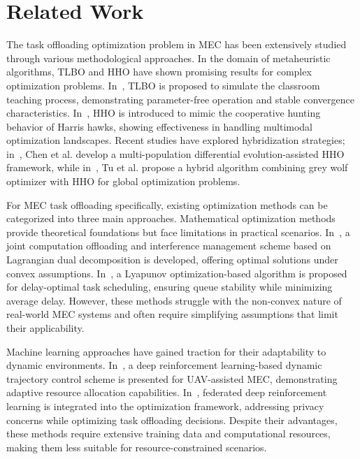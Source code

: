 \documentclass[conference]{IEEEtran}
\begin{document}
\section{Related Work}

The task offloading optimization problem in MEC has been extensively studied through various methodological approaches. In the domain of metaheuristic algorithms, TLBO and HHO have shown promising results for complex optimization problems. In~\cite{rao2011teaching}, TLBO is proposed to simulate the classroom teaching process, demonstrating parameter-free operation and stable convergence characteristics. In~\cite{heidari2019harris}, HHO is introduced to mimic the cooperative hunting behavior of Harris hawks, showing effectiveness in handling multimodal optimization landscapes. Recent studies have explored hybridization strategies; in~\cite{chen2020multi}, Chen et al. develop a multi-population differential evolution-assisted HHO framework, while in~\cite{tu2023hybrid}, Tu et al. propose a hybrid algorithm combining grey wolf optimizer with HHO for global optimization problems.

For MEC task offloading specifically, existing optimization methods can be categorized into three main approaches. Mathematical optimization methods provide theoretical foundations but face limitations in practical scenarios. In~\cite{wang2017joint}, a joint computation offloading and interference management scheme based on Lagrangian dual decomposition is developed, offering optimal solutions under convex assumptions. In~\cite{liu2016delay}, a Lyapunov optimization-based algorithm is proposed for delay-optimal task scheduling, ensuring queue stability while minimizing average delay. However, these methods struggle with the non-convex nature of real-world MEC systems and often require simplifying assumptions that limit their applicability.

Machine learning approaches have gained traction for their adaptability to dynamic environments. In~\cite{wang2021deep}, a deep reinforcement learning-based dynamic trajectory control scheme is presented for UAV-assisted MEC, demonstrating adaptive resource allocation capabilities. In~\cite{zang2022federated}, federated deep reinforcement learning is integrated into the optimization framework, addressing privacy concerns while optimizing task offloading decisions. Despite their advantages, these methods require extensive training data and computational resources, making them less suitable for resource-constrained scenarios.
\end{document}
